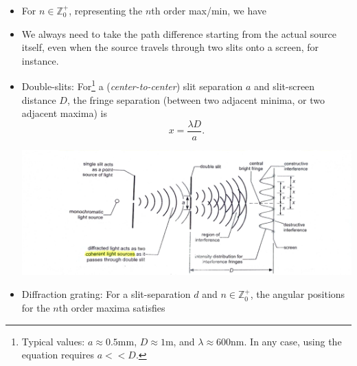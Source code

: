 \documentclass[oneside]{book}
\begin{document}
\begin{itemize}
\begin{enumerate}
    \end{enumerate}
    \item For \(n \in \mathbb{Z}^{+}_{0}\), representing the \(n\)th order max/min, we have 
    \item We always need to take the path difference starting from the actual source itself, even when the source travels through two slits onto a screen, for instance.
    \item Double-slits: For\footnote{Typical values: \(a \approx 0.5\)mm, \(D \approx 1\)m, and \(\lambda \approx 600\)nm. In any case, using the equation requires \(a<<D\).} a (\emph{center-to-center}) slit separation \(a\) and slit-screen distance \(D\), the fringe separation (between two adjacent minima, or two adjacent maxima) is
    \[x=\frac{\lambda D}{a}.\]
    \begin{center}
        \includegraphics[scale=0.1]{../images/Double-Slit Diffraction.jpg}
        \captionsetup{type=figure}
    \end{center}
    \setcounter{footnote}{4}
    \item Diffraction grating: For a slit-separation \(d\) and \(n \in \mathbb{Z}^{+}_{0}\), the angular positions for the \(n\)th order maxima satisfies

\end{itemize}
\end{document}
